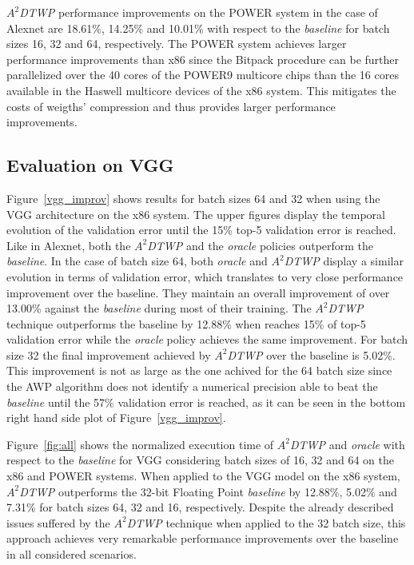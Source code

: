 \textit{$A^2$DTWP} performance improvements on the POWER system in the case of 
Alexnet are 18.61\%, 14.25\% and 10.01\% with respect to the \textit{baseline} for batch sizes 16, 32 and 64, respectively.  
The POWER system achieves larger performance improvements than x86 since the 
Bitpack procedure can be further parallelized over the 40 cores of the POWER9 
multicore chips than the 16 cores available in the Haswell multicore devices of the x86 system. 
This mitigates the costs of weigths' compression and thus provides larger performance improvements. 

\subsection{Evaluation on VGG}
\label{sec:VGG}

Figure~\ref{vgg_improv} shows results for batch sizes 64 and 32 when using the 
VGG architecture on the x86 system. 
The upper figures display the temporal evolution of the validation error until the 15\% top-5 validation error is reached.
Like in Alexnet, both the \textit{$A^2$DTWP} and the \textit{oracle} policies outperform the \textit{baseline}.
In the case of batch size 64, both \textit{oracle} and \textit{$A^2$DTWP} 
display a similar evolution in terms of validation error, which translates to 
very close performance improvement over the baseline. 
They maintain an overall improvement of over 13.00\% against the \textit{baseline} 
during most of their training. The \textit{$A^2$DTWP} technique outperforms the baseline by 
12.88\% when reaches 15\% of top-5 validation error while the 
\textit{oracle} policy achieves the same improvement.
For batch size 32 the final improvement achieved by \textit{$A^2$DTWP} over the baseline is 5.02\%.
This improvement is not as large as the one achived for the 64 batch size since the AWP algorithm does not identify a numerical precision able to beat the \textit{baseline} until the 57\% validation error is reached, as it can be seen in the bottom right hand side plot of Figure~\ref{vgg_improv}. 

Figure~\ref{fig:all} shows the normalized execution time of \textit{$A^2$DTWP} 
and \textit{oracle} with respect to the \textit{baseline} for VGG considering 
batch sizes of 16, 32 and 64 on the x86 and POWER systems.
When applied to the VGG model on the x86 system, \textit{$A^2$DTWP} outperforms the 32-bit Floating Point \textit{baseline} by 12.88\%, 5.02\% and 7.31\% for batch sizes 64, 32 and 16, respectively.
Despite the already described issues suffered by the \textit{$A^2$DTWP} technique when applied to the 32 batch size, this approach achieves very remarkable performance improvements over the baseline in all considered scenarios. 

